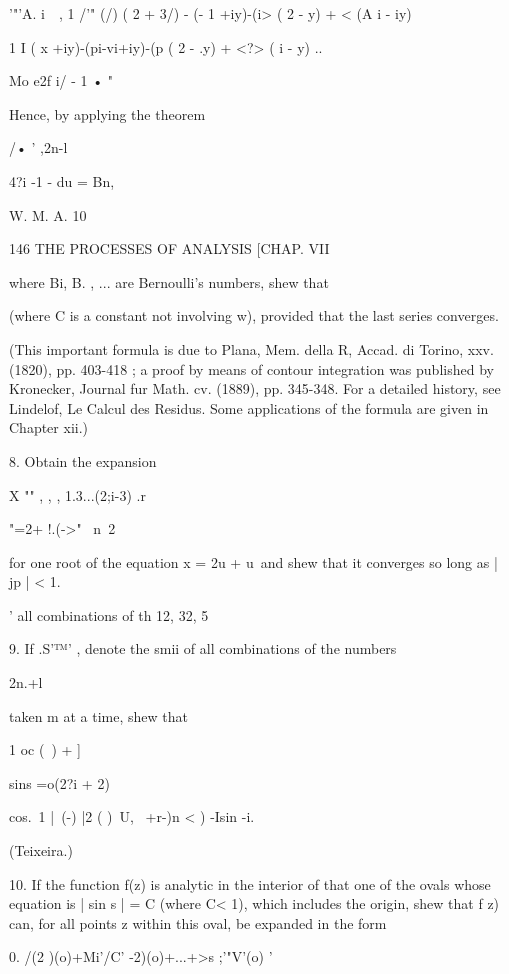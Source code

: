 {{'"'A. i~\ , 1 /'" (/) ( 2 + 3/) - (- 1 +iy)-(i> ( 2 - y) + < (A i -
iy)



1 I ( x +iy)-(pi-vi+iy)-(p ( 2 - .y) + <?> ( i - y) ..

Mo e2f i/ - 1 • "

Hence, by applying the theorem

/• ' ,2n-l

4?i -1 - du = Bn,

W. M. A. 10



146 THE PROCESSES OF ANALYSIS [CHAP. VII

where Bi, B. , ... are Bernoulli's numbers, shew that

(where C is a constant not involving w), provided that the last series
converges.

(This important formula is due to Plana, Mem. della R, Accad. di
Torino, xxv. (1820), pp. 403-418 ; a proof by means of contour
integration was published by Kronecker, Journal fur Math. cv. (1889),
pp. 345-348. For a detailed history, see Lindelof, Le Calcul des
Residus. Some applications of the formula are given in Chapter xii.)

8. Obtain the expansion

X "" , , , 1.3...(2;i-3) .r

"=2+ !.(->"~ n\ 2

for one root of the equation x = 2u + u\ and shew that it converges so
long as | jp | < 1.

' all combinations of th 12, 32, 5%



9. If .S'™' , denote the smii of all combinations of the numbers

2n.+l



taken m at a time, shew that

1 oc (\ ) + ]

sins =o(2?i + 2)



cos.\ 1 |\ (-) |2 ( )\ U, \ +r-)n < ) -Isin -i.



(Teixeira.)

10. If the function f(z) is analytic in the interior of that one of
the ovals whose equation is | sin s | = C (where C< 1), which includes
the origin, shew that f z) can, for all points z within this oval, be
expanded in the form

0. /(2 )(o)+Mi'/C' -2)(o)+...+>s ;'"V'(o) '

}}
